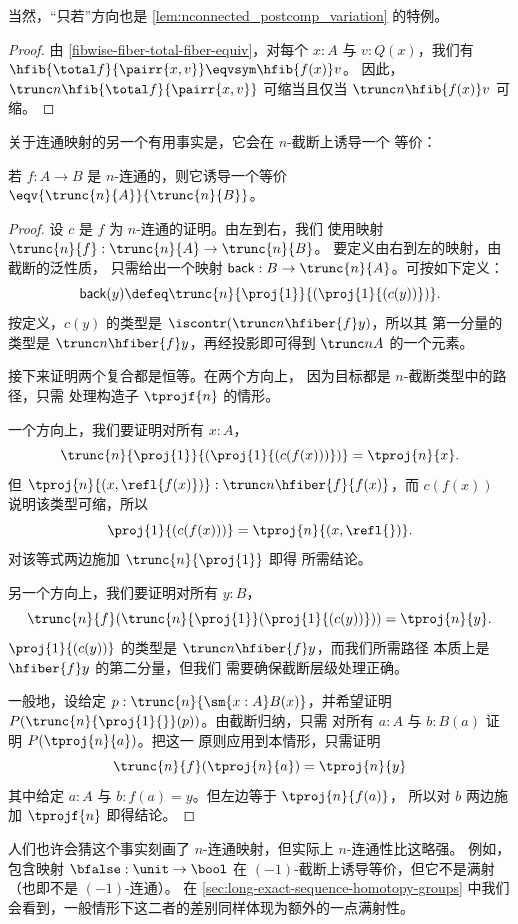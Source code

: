 当然，“只若”方向也是 \cref{lem:nconnected_postcomp_variation} 的特例。

\begin{proof}
由 \cref{fibwise-fiber-total-fiber-equiv}，对每个 $x:A$ 与 $v:Q(x)$，我们有
$\hfib{\total f}{\pairr{x,v}}\eqvsym\hfib{f(x)}v$。
因此，$\trunc n{\hfib{\total f}{\pairr{x,v}}}$ 可缩当且仅当
$\trunc n{\hfib{f(x)}v}$ 可缩。
\end{proof}

关于连通映射的另一个有用事实是，它会在 $n$-截断上诱导一个
等价：

\begin{lem} \label{lem:connected-map-equiv-truncation}
若 $f : A \to B$ 是 $n$-连通的，则它诱导一个等价
$\eqv{\trunc{n}{A}}{\trunc{n}{B}}$。
\end{lem}
\begin{proof}
设 $c$ 是 $f$ 为 $n$-连通的证明。由左到右，我们
使用映射 $\trunc{n}{f} : \trunc{n}{A} \to \trunc{n}{B}$。
要定义由右到左的映射，由截断的泛性质，
只需给出一个映射 $\mathsf{back} : B \to {\trunc{n}{A}}$。可按如下定义：
\[
\mathsf{back}(y) \defeq \trunc{n}{\proj{1}}{(\proj{1}{(c(y))})}.
\]
按定义，$c(y)$ 的类型是 $\iscontr(\trunc n {\hfiber{f}y})$，所以其
第一分量的类型是 $\trunc n{\hfiber{f}y}$，再经投影即可得到
$\trunc n A$ 的一个元素。

接下来证明两个复合都是恒等。在两个方向上，
因为目标都是 $n$-截断类型中的路径，只需
处理构造子 $\tprojf{n}$ 的情形。

一个方向上，我们要证明对所有 $x:A$，
\[
\trunc{n}{\proj{1}}{(\proj{1}{(c(f(x)))})} = \tproj{n}{x}.
\]
但 $\tproj{n}{(x, \refl{f(x)})} : \trunc n{\hfiber{f}{f(x)}}$，而
$c(f(x))$ 说明该类型可缩，所以
\[
\proj{1}{(c(f(x)))} = \tproj{n}{(x, \refl{})}.
\]
对该等式两边施加 $\trunc{n}{\proj{1}}$ 即得
所需结论。

另一个方向上，我们要证明对所有 $y:B$，
\[
\trunc{n}{f}(\trunc{n}{\proj{1}} (\proj{1}{(c(y))})) = \tproj{n}{y}.
\]
$\proj{1}{(c(y))}$ 的类型是 $\trunc n {\hfiber{f}y}$，而我们所需路径
本质上是 $\hfiber{f}y$ 的第二分量，但我们
需要确保截断层级处理正确。

一般地，设给定 $p:\trunc{n}{\sm{x:A} B(x)}$，并希望证明
$P(\trunc{n}{\proj{1}{}}(p))$。由截断归纳，只需
对所有 $a:A$ 与 $b:B(a)$ 证明 $P(\tproj{n}{a})$。把这一
原则应用到本情形，只需证明
\[
\trunc{n}{f}(\tproj{n}{a}) = \tproj{n}{y}
\]
其中给定 $a:A$ 与 $b:f (a) = y$。但左边等于 $\tproj{n}{f (a)}$，
所以对 $b$ 两边施加 $\tprojf{n}$ 即得结论。
\end{proof}

人们也许会猜这个事实刻画了 $n$-连通映射，但实际上 $n$-连通性比这略强。
例如，包含映射 $\bfalse:\unit \to\bool$ 在 $(-1)$-截断上诱导等价，但它不是满射（也即不是 $(-1)$-连通）。
在 \cref{sec:long-exact-sequence-homotopy-groups} 中我们会看到，一般情形下这二者的差别同样体现为额外的一点满射性。

